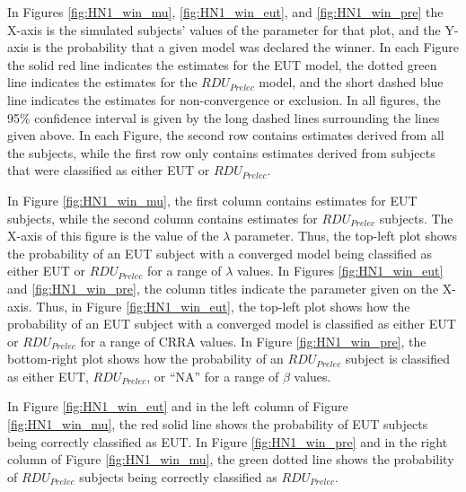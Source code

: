 \documentclass[../main.tex]{subfiles}
\begin{document}
In Figures \ref{fig:HN1_win_mu}, \ref{fig:HN1_win_eut}, and \ref{fig:HN1_win_pre} the X-axis is the simulated subjects' values of the parameter for that plot, and the Y-axis is the probability that a given model was declared the winner.
In each Figure the solid red line indicates the estimates for the EUT model, the dotted green line indicates the estimates for the $\mathit{RDU_{Prelec}}$ model, and the short dashed blue line indicates the estimates for non-convergence or exclusion.
In all figures, the 95\% confidence interval is given by the long dashed lines surrounding the lines given above.
In each Figure, the second row contains estimates derived from all the subjects, while the first row only contains estimates derived from subjects that were classified as either EUT or $\mathit{RDU_{Prelec}}$.

In Figure \ref{fig:HN1_win_mu}, the first column contains estimates for EUT subjects, while the second column contains estimates for $\mathit{RDU_{Prelec}}$ subjects.
The X-axis of this figure is the value of the $\lambda$ parameter.
Thus, the top-left plot shows the probability of an EUT subject with a converged model being classified as either EUT or $\mathit{RDU_{Prelec}}$ for a range of $\lambda$ values.
In Figures \ref{fig:HN1_win_eut} and \ref{fig:HN1_win_pre}, the column titles indicate the parameter given on the X-axis.
Thus, in Figure \ref{fig:HN1_win_eut}, the top-left plot shows how the probability of an EUT subject with a converged model is classified as either EUT or $\mathit{RDU_{Prelec}}$ for a range of CRRA values.
In Figure \ref{fig:HN1_win_pre}, the bottom-right plot shows how the probability of an $\mathit{RDU_{Prelec}}$ subject is classified as either EUT, $\mathit{RDU_{Prelec}}$, or \enquote{NA} for a range of $\beta$ values.

In Figure \ref{fig:HN1_win_eut} and in the left column of Figure \ref{fig:HN1_win_mu}, the red solid line shows the probability of EUT subjects being correctly classified as EUT.
In Figure \ref{fig:HN1_win_pre} and in the right column of Figure \ref{fig:HN1_win_mu}, the green dotted line shows the probability of $\mathit{RDU_{Prelec}}$ subjects being correctly classified as $\mathit{RDU_{Prelec}}$.
\end{document}
